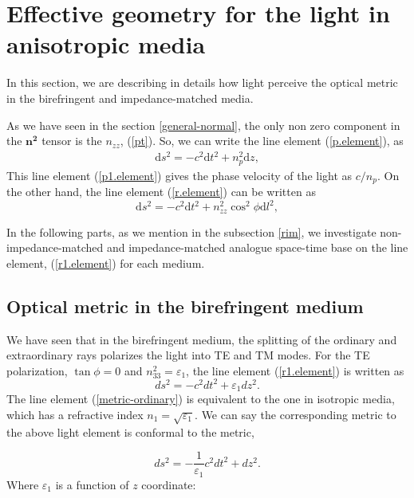 \documentclass[9pt,twocolumn,twoside]{osajnl}
\begin{document}
 \section{Effective geometry for the light in anisotropic media}\label{vo}
 
In this section, we are describing in details how light perceive the optical metric in the birefringent and impedance-matched media. 

 As we have seen in the section \ref{general-normal},  the only non zero component in the $\mathbf{n^{2}}$ tensor is the $n_{zz}$, (\ref{pt}). So, we can write the line element (\ref{p.element}), as
\begin{eqnarray}\label{p1.element}
\mathrm{d}s^{2}=-c^{2}\mathrm{d}{t}^{2}+{n}^{2}_{p}{\mathrm{d}{z}},
\end{eqnarray}
This line element (\ref{p1.element}) gives the phase velocity of the light as $c/n_{p}$.
On the other hand, the line element (\ref{r.element}) can be written as
\begin{equation}\label{r1.element}
\mathrm{d}s^{2}=-c^{2}\mathrm{d}{t}^{2}+n^{2}_{zz}\cos^{2}{\phi} \mathrm{d}{l}^{2},
\end{equation}


In the  following parts, as we mention in the subsection \ref{rim}, we investigate non-impedance-matched and impedance-matched analogue space-time base on the line element, (\ref{r1.element}) for each medium.
  
\subsection{Optical metric in the birefringent medium }
 
We have seen that in the birefringent medium, the splitting of the ordinary and extraordinary rays polarizes the light into TE and TM modes. 
For the TE polarization, $\tan{\phi}=0$ and $n^{2}_{33}=\varepsilon_{1}$,  the line element (\ref{r1.element}) is written as
\begin{equation} \label{metric-ordinary}
ds^{2}=- c^{2}dt^{2} + \varepsilon_{1}dz^2.
\end{equation}
The line element (\ref{metric-ordinary}) is equivalent to the one in isotropic media, which has a  refractive index $ n_{1}=\sqrt{\varepsilon_{1}}$. We can say the corresponding metric to the above light element is conformal to  the metric, 

\begin{equation} \label{metric-ordinary-c}
ds^{2}=-\frac{1}{\varepsilon_{1}}c^{2}dt^{2} + dz^2.
\end{equation}
Where $\varepsilon_{1}$ is a function of $z$ coordinate:
\end{document}
